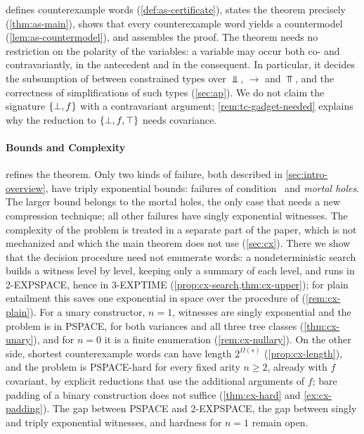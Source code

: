  defines counterexample words (\cref{def:as-certificate}),
states the theorem precisely (\cref{thm:as-main}), shows that every
counterexample word yields a countermodel (\cref{lem:as-countermodel}), and
assembles the proof. The theorem needs no restriction on the polarity of
the variables: a variable may occur both co- and contravariantly, in the
antecedent and in the consequent. In particular, it decides the subsumption of
\citet{TrifonovSmith96} between constrained types over $\Bot$, $\to$ and
$\Top$, and the correctness of simplifications of such types
(\cref{sec:ap}). We do not claim the signature $\{\bot,f\}$ with a contravariant
argument; \cref{rem:tc-gadget-needed} explains why the reduction to $\{\bot,f,\top\}$
needs covariance.

\paragraph{Bounds and Complexity}
 refines the theorem. Only two kinds of failure, both
described in \cref{sec:intro-overview}, have triply exponential bounds:
failures of condition \CondU\ and \emph{mortal holes}. The larger bound belongs
to the mortal holes, the only case that needs a new compression technique; all
other failures have singly exponential witnesses. The complexity of the
problem is treated in a separate part of the paper, which is not mechanized and
which the main theorem does not use (\cref{sec:cx}). There we show that the
decision procedure need not enumerate words: a nondeterministic search builds a
witness level by level, keeping only a summary of each level, and runs in
2-EXPSPACE, hence in 3-EXPTIME (\cref{prop:cx-search,thm:cx-upper}); for plain
entailment this saves one exponential in space over the procedure of
\citet{Zhao26} (\cref{rem:cx-plain}). For a unary constructor, $n=1$,
witnesses are singly exponential and the problem is in PSPACE, for both
variances and all three tree classes (\cref{thm:cx-unary}), and for $n=0$ it is
a finite enumeration (\cref{rem:cx-nullary}). On the other side, shortest
counterexample words can have length $2^{\Omega(s)}$ (\cref{prop:cx-length}),
and the problem is PSPACE-hard for every fixed arity $n\ge2$, already with $f$
covariant, by explicit reductions that use the additional arguments of $f$;
bare padding of a binary construction does not suffice (\cref{thm:cx-hard} and
\cref{ex:cx-padding}). The gap between PSPACE and 2-EXPSPACE, the gap between
singly and triply exponential witnesses, and hardness for $n=1$ remain open.

